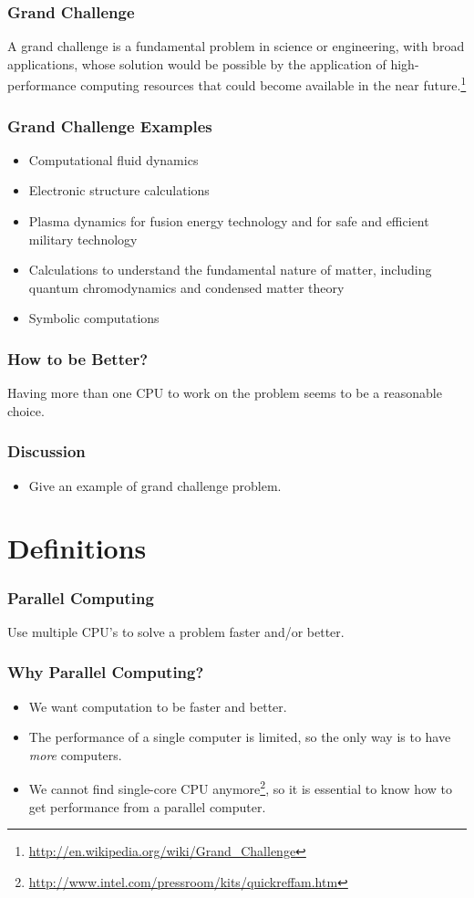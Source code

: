 \documentclass{beamer}
\begin{document}
\begin{CJK}{UTF8}{bsmi}
  \begin{frame}
    \frametitle{Grand Challenge} A grand challenge is a fundamental problem in science or engineering, with broad applications, whose solution would be possible by the application of high-performance computing resources that could become available in the near future.\footnote{\url{http://en.wikipedia.org/wiki/Grand_Challenge}}
  \end{frame}

  \begin{frame}
    \frametitle{Grand Challenge Examples} 
    \begin{itemize}
    \item Computational fluid dynamics
    \item Electronic structure calculations
    \item Plasma dynamics for fusion energy technology and for safe and
      efficient military technology
    \item Calculations to understand the fundamental nature of matter,
      including quantum chromodynamics and condensed matter theory
    \item Symbolic computations
    \end{itemize}
  \end{frame}

  \begin{frame}
    \frametitle{How to be Better?}
    \Huge Having more than one CPU to work on the problem seems to be a
    reasonable choice.
  \end{frame}

  \begin{frame}
    \frametitle{Discussion} 
    \begin{itemize}
    \item Give an example of grand challenge problem.
    \end{itemize}
  \end{frame}


  \section{Definitions}

  \begin{frame}
    \frametitle{Parallel Computing}  \Huge Use multiple CPU's to solve a
    problem faster and/or better.
  \end{frame}

  \begin{frame}
    \frametitle{Why Parallel Computing?}
    \begin{itemize}
    \item We want computation to be faster and better.
    \item The performance of a single computer is limited, so the only way
      is to have {\em more} computers.
    \item We cannot find single-core CPU
      anymore\footnote{\url{http://www.intel.com/pressroom/kits/quickreffam.htm}},
      so it is essential to know how to get performance from a parallel
      computer.
    \end{itemize}
  \end{frame}


\end{CJK}
\end{document}

